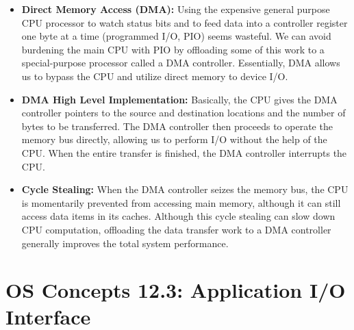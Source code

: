 \documentclass[12pt]{article}
\begin{document}
\begin{itemize}
    \item \textbf{Direct Memory Access (DMA):} Using the expensive general purpose CPU processor to watch status bits and to feed data into a controller register one byte at a time (programmed I/O, PIO) seems wasteful. We can avoid burdening the main CPU with PIO by offloading some of this work to a special-purpose processor called a DMA controller. Essentially, DMA allows us to bypass the CPU and utilize direct memory to device I/O.
    \item \textbf{DMA High Level Implementation:} Basically, the CPU gives the DMA controller pointers to the source and destination locations and the number of bytes to be transferred. The DMA controller then proceeds to operate the memory bus directly, allowing us to perform I/O without the help of the CPU. When the entire transfer is finished, the DMA controller interrupts the CPU.
    \item \textbf{Cycle Stealing:} When the DMA controller seizes the memory bus, the CPU is momentarily prevented from accessing main memory, although it can still access data items in its caches. Although this cycle stealing can slow down CPU computation, offloading the data transfer work to a DMA controller generally improves the total system performance.
\end{itemize}

\section*{OS Concepts 12.3: Application I/O Interface}
\end{document}
